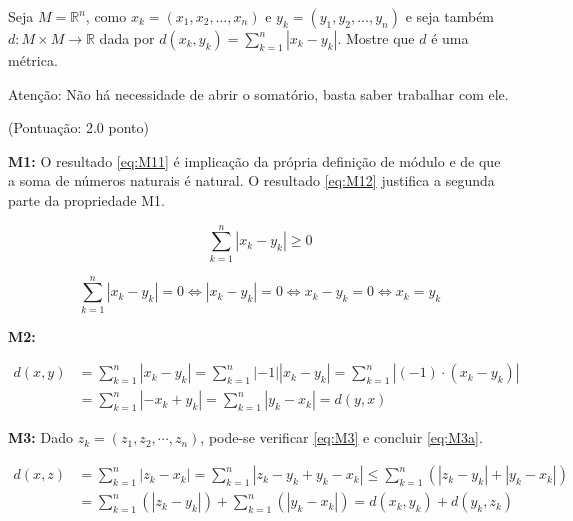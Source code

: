 \documentclass[10pt,a4paper]{article}
\begin{document}
	Seja $ M = \mathbb{R}^n $, como $ x_k = (x_1, x_2, \dots, x_n) $ e $ y_k = (y_1, y_2, \dots, y_n) $ e seja também $ d: M \times M \rightarrow \mathbb{R} $  dada por $ d(x_k, y_k) = \sum_{k=1}^{n} \left| x_k - y_k \right| $. Mostre que $ d $ é uma métrica.
	
	Atenção: Não há necessidade de abrir o somatório, basta saber trabalhar com ele.
	
	(Pontuação: 2.0 ponto)
	
	\textbf{M1:} O resultado \ref{eq:M11} é implicação da própria definição de módulo e de que a soma de números naturais é natural. O resultado \ref{eq:M12} justifica a segunda parte da propriedade M1.
	
	\begin{equation}\label{eq:M11}
		\sum_{k=1}^{n} \left| x_k - y_k \right| \ge 0
	\end{equation}
	
	\begin{equation}\label{eq:M12}
		\sum_{k=1}^{n} \left| x_k - y_k \right| = 0 \Leftrightarrow \left| x_k - y_k \right| = 0 \Leftrightarrow x_k - y_k = 0 \Leftrightarrow x_k = y_k
	\end{equation}
	
	\textbf{M2:}
	
	\begin{equation}
		\begin{aligned}
		d(x, y) &=\sum_{k=1}^{n} \left| x_k - y_k \right| = \sum_{k=1}^{n} \left| -1 \right| \left| x_k - y_k \right| = \sum_{k=1}^{n} \left| (-1) \cdot (x_k - y_k)\right|\\
		&= \sum_{k=1}^{n} \left|-x_k + y_k \right| = \sum_{k=1}^{n} \left|y_k - x_k \right| = d(y, x)
		\end{aligned}
	\end{equation}
	
	\textbf{M3:} Dado $ z_k = (z_1, z_2, \cdots, z_n) $, pode-se verificar \ref{eq:M3} e concluir \ref{eq:M3a}.
	
	\begin{equation}\label{eq:M3}
		\begin{aligned}
		d(x, z) &= \sum_{k=1}^{n} \left| z_k - x_k \right| = \sum_{k=1}^{n} \left| z_k  - y_k + y_k - x_k \right| \le 
		\sum_{k=1}^{n} \left( \left| z_k - y_k \right| + \left| y_k - x_k \right| \right) \\&=
		\sum_{k=1}^{n} \left( \left| z_k - y_k \right|\right) +
		\sum_{k=1}^{n} \left(\left| y_k - x_k \right| \right) = d(x_k, y_k) + d(y_k, z_k)
		\end{aligned}
	\end{equation}
	
\end{document}
